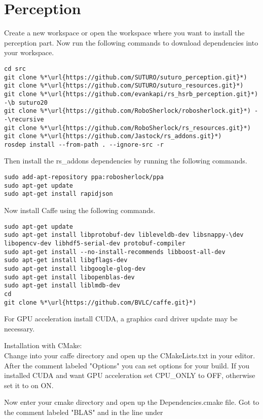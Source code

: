 \documentclass[main.tex]{subfiles}
\begin{document}
 \section{Perception}
 Create a new workspace or open the workspace where you want to install the perception part. Now run the following commands to download dependencies into your workspace.
 
 \begin{lstlisting}
cd src
git clone %*\url{https://github.com/SUTURO/suturo_perception.git}*)
git clone %*\url{https://github.com/SUTURO/suturo_resources.git}*) 
git clone %*\url{https://github.com/evankapi/rs_hsrb_perception.git}*) -\b suturo20
git clone %*\url{https://github.com/RoboSherlock/robosherlock.git}*) --\recursive
git clone %*\url{https://github.com/RoboSherlock/rs_resources.git}*)
git clone %*\url{https://github.com/Jastock/rs_addons.git}*)
rosdep install --from-path . --ignore-src -r 
\end{lstlisting}
 
 Then install the rs\_addons dependencies by running the following commands.
 \begin{lstlisting}
sudo add-apt-repository ppa:robosherlock/ppa
sudo apt-get update
sudo apt-get install rapidjson 
\end{lstlisting}
 
 
 Now install Caffe using the following commands.
 \begin{lstlisting}
sudo apt-get update
sudo apt-get install libprotobuf-dev libleveldb-dev libsnappy-\dev libopencv-dev libhdf5-serial-dev protobuf-compiler
sudo apt-get install --no-install-recommends libboost-all-dev
sudo apt-get install libgflags-dev
sudo apt-get install libgoogle-glog-dev
sudo apt-get install libopenblas-dev
sudo apt-get install liblmdb-dev
cd 
git clone %*\url{https://github.com/BVLC/caffe.git}*)
\end{lstlisting}
 
 For GPU acceleration install CUDA, a graphics card driver update may be necessary.
 
 Installation with CMake:\\
 
 Change into your caffe directory and open up the CMakeLists.txt in your editor. After the comment labeled "Options" you can set options for your build. If you installed CUDA and want GPU acceleration set CPU\_ONLY to OFF, otherwise set it to on ON.
 
 Now enter your cmake directory and open up the Dependencies.cmake file. Got to the comment labeled "BLAS" and in the line under 
 
\end{document}
